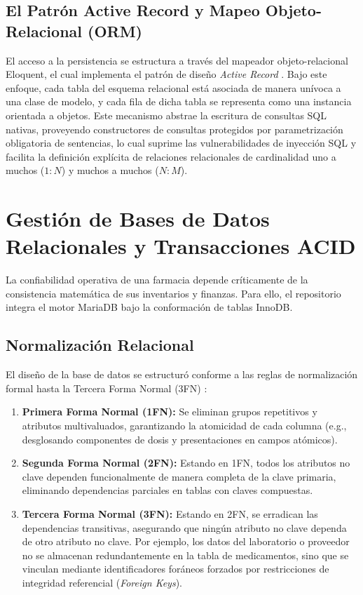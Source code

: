 \subsection{El Patrón Active Record y Mapeo Objeto-Relacional (ORM)}
El acceso a la persistencia se estructura a través del mapeador objeto-relacional Eloquent, el cual implementa el patrón de diseño \textit{Active Record} \cite{otwell2024laravel}. Bajo este enfoque, cada tabla del esquema relacional está asociada de manera unívoca a una clase de modelo, y cada fila de dicha tabla se representa como una instancia orientada a objetos. Este mecanismo abstrae la escritura de consultas SQL nativas, proveyendo constructores de consultas protegidos por parametrización obligatoria de sentencias, lo cual suprime las vulnerabilidades de inyección SQL y facilita la definición explícita de relaciones relacionales de cardinalidad uno a muchos ($1:N$) y muchos a muchos ($N:M$).

\section{Gestión de Bases de Datos Relacionales y Transacciones ACID}

La confiabilidad operativa de una farmacia depende críticamente de la consistencia matemática de sus inventarios y finanzas. Para ello, el repositorio integra el motor MariaDB bajo la conformación de tablas InnoDB.

\subsection{Normalización Relacional}
El diseño de la base de datos se estructuró conforme a las reglas de normalización formal hasta la Tercera Forma Normal (3FN) \cite{elmasri2016}:
\begin{enumerate}
    \item \textbf{Primera Forma Normal (1FN):} Se eliminan grupos repetitivos y atributos multivaluados, garantizando la atomicidad de cada columna (e.g., desglosando componentes de dosis y presentaciones en campos atómicos).
    \item \textbf{Segunda Forma Normal (2FN):} Estando en 1FN, todos los atributos no clave dependen funcionalmente de manera completa de la clave primaria, eliminando dependencias parciales en tablas con claves compuestas.
    \item \textbf{Tercera Forma Normal (3FN):} Estando en 2FN, se erradican las dependencias transitivas, asegurando que ningún atributo no clave dependa de otro atributo no clave. Por ejemplo, los datos del laboratorio o proveedor no se almacenan redundantemente en la tabla de medicamentos, sino que se vinculan mediante identificadores foráneos forzados por restricciones de integridad referencial (\textit{Foreign Keys}).
\end{enumerate}

